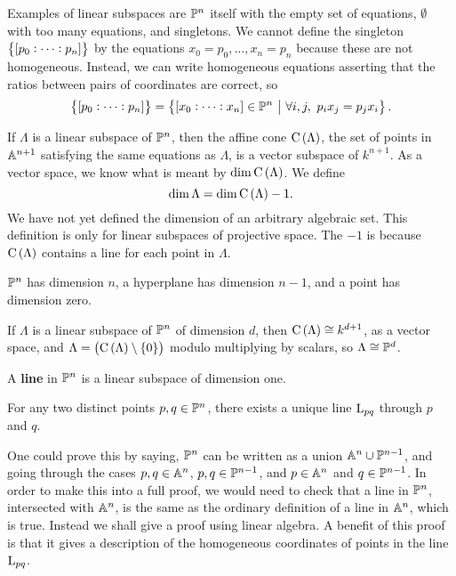 \begin{example*}
Examples of linear subspaces are $ \PP^n $ itself with the empty set of equations, $ \emptyset $ with too many equations, and singletons. We cannot define the singleton $ \cbr{\sbr{p_0 : \dots : p_n}} $ by the equations $ x_0 = p_0, \dots, x_n = p_n $ because these are not homogeneous. Instead, we can write homogeneous equations asserting that the ratios between pairs of coordinates are correct, so
$$ \cbr{\sbr{p_0 : \dots : p_n}} = \cbr{\sbr{x_0 : \dots : x_n} \in \PP^n \st \forall i, j, \ p_ix_j = p_jx_i}. $$
\end{example*}

If $ \Lambda $ is a linear subspace of $ \PP^n $, then the affine cone $ \C\br{\Lambda} $, the set of points in $ \AA^{n + 1} $ satisfying the same equations as $ \Lambda $, is a vector subspace of $ k^{n + 1} $. As a vector space, we know what is meant by $ \dim \C\br{\Lambda} $. We define
$$ \dim \Lambda = \dim \C\br{\Lambda} - 1. $$
We have not yet defined the dimension of an arbitrary algebraic set. This definition is only for linear subspaces of projective space. The $ -1 $ is because $ \C\br{\Lambda} $ contains a line for each point in $ \Lambda $.

\begin{example*}
$ \PP^n $ has dimension $ n $, a hyperplane has dimension $ n - 1 $, and a point has dimension zero.
\end{example*}

If $ \Lambda $ is a linear subspace of $ \PP^n $ of dimension $ d $, then $ \C\br{\Lambda} \cong k^{d + 1} $, as a vector space, and $ \Lambda = \br{\C\br{\Lambda} \setminus \cbr{0}} $ modulo multiplying by scalars, so $ \Lambda \cong \PP^d $.

\begin{definition*}
A \textbf{line} in $ \PP^n $ is a linear subspace of dimension one.
\end{definition*}


\begin{lemma}
For any two distinct points $ p, q \in \PP^n $, there exists a unique line $ \L_{pq} $ through $ p $ and $ q $.
\end{lemma}

One could prove this by saying, $ \PP^n $ can be written as a union $ \AA^n \cup \PP^{n - 1} $, and going through the cases $ p, q \in \AA^n $, $ p, q \in \PP^{n - 1} $, and $ p \in \AA^n $ and $ q \in \PP^{n - 1} $. In order to make this into a full proof, we would need to check that a line in $ \PP^n $, intersected with $ \AA^n $, is the same as the ordinary definition of a line in $ \AA^n $, which is true. Instead we shall give a proof using linear algebra. A benefit of this proof is that it gives a description of the homogeneous coordinates of points in the line $ \L_{pq} $.

